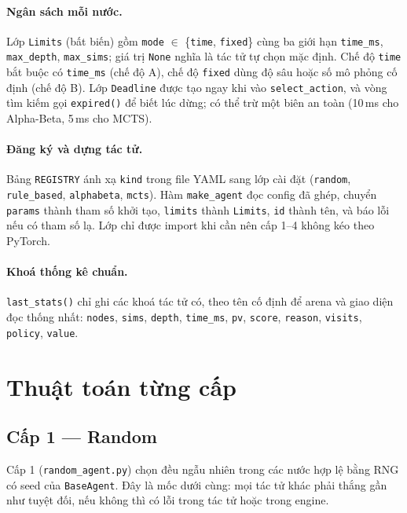 \paragraph{Ngân sách mỗi nước.}
Lớp \texttt{Limits} (bất biến) gồm \texttt{mode} $\in$ \{\texttt{time}, \texttt{fixed}\} cùng ba giới hạn \texttt{time\_ms}, \texttt{max\_depth}, \texttt{max\_sims}; giá trị \texttt{None} nghĩa là tác tử tự chọn mặc định. Chế độ \texttt{time} bắt buộc có \texttt{time\_ms} (chế độ A), chế độ \texttt{fixed} dùng độ sâu hoặc số mô phỏng cố định (chế độ B). Lớp \texttt{Deadline} được tạo ngay khi vào \texttt{select\_action}, và vòng tìm kiếm gọi \texttt{expired()} để biết lúc dừng; có thể trừ một biên an toàn (10\,ms cho Alpha-Beta, 5\,ms cho MCTS).

\paragraph{Đăng ký và dựng tác tử.}
Bảng \texttt{REGISTRY} ánh xạ \texttt{kind} trong file YAML sang lớp cài đặt (\texttt{random}, \texttt{rule\_based}, \texttt{alphabeta}, \texttt{mcts}). Hàm \texttt{make\_agent} đọc config đã ghép, chuyển \texttt{params} thành tham số khởi tạo, \texttt{limits} thành \texttt{Limits}, \texttt{id} thành tên, và báo lỗi nếu có tham số lạ. Lớp chỉ được import khi cần nên cấp 1--4 không kéo theo PyTorch.

\paragraph{Khoá thống kê chuẩn.}
\texttt{last\_stats()} chỉ ghi các khoá tác tử có, theo tên cố định để arena và giao diện đọc thống nhất: \texttt{nodes}, \texttt{sims}, \texttt{depth}, \texttt{time\_ms}, \texttt{pv}, \texttt{score}, \texttt{reason}, \texttt{visits}, \texttt{policy}, \texttt{value}.

\section{Thuật toán từng cấp}
\label{sec:pp-thuat-toan}
\subsection{Cấp 1 --- Random}
Cấp 1 (\texttt{random\_agent.py}) chọn đều ngẫu nhiên trong các nước hợp lệ bằng RNG có seed của \texttt{BaseAgent}. Đây là mốc dưới cùng: mọi tác tử khác phải thắng gần như tuyệt đối, nếu không thì có lỗi trong tác tử hoặc trong engine.
